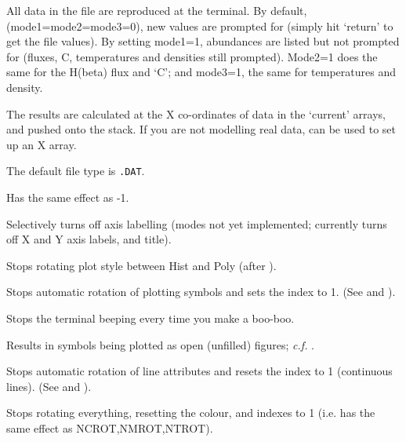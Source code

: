 \begin {description}
All data in the file are reproduced at the terminal. By default,
(mode1=mode2=mode3=0), new values are prompted for (simply hit
`return' to get the file values). By setting mode1=1, abundances are
listed but not prompted for (fluxes, C, temperatures and densities
still prompted). Mode2=1 does the same for the H(beta) flux and `C';
and mode3=1, the same for temperatures and density.

The results are calculated at the X co-ordinates of data in the
`current' arrays, and pushed onto the stack. If you are not modelling
real data,   can be used to set up an X array.

The default file type is {\tt{.DAT}}. 

Has the same effect as   -1.

Selectively turns off axis labelling (modes not yet implemented;
  currently turns off X and Y axis labels, and title).

Stops rotating plot style between Hist and Poly (after ). 

Stops automatic rotation of plotting symbols and sets the   index to 1.
(See   and ). 

Stops the terminal beeping every time you make a boo-boo.

Results in   symbols being plotted as open (unfilled) figures;
{\it c.f.} . 

Stops automatic rotation of line attributes and resets the   index
to 1 (continuous lines). (See   and ). 

Stops rotating everything, resetting the colour,   and  
indexes to 1 (i.e. has the same effect as NCROT,NMROT,NTROT).


\end{description}
